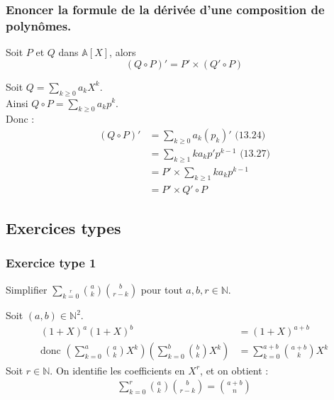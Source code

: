 \documentclass[titlepage, twoside]{report}
\begin{document}
\subsubsection{Enoncer la formule de la dérivée d'une composition de polynômes. }
\begin{tcolorbox}[title=Propostion 13.28, title filled=false, colframe=lightblue, colback=lightblue!10!white]
    Soit $P$ et $Q$ dans $\mathbb{A}[X]$, alors 
    $$(Q \circ P)' = P' \times (Q' \circ P)$$
\end{tcolorbox}

\noindent Soit $Q = \sum\limits_{k \geq 0} a_k X^k$. \\
Ainsi $Q \circ P = \sum\limits_{k \geq 0} a_k p^k$. \\
Donc : 
\begin{align*}
    (Q \circ P)' &= \sum_{k \geq 0} a_k (p_k)' \text{ (13.24)} \\
    &= \sum_{k \geq 1} k a_k p' p^{k-1} \text{ (13.27)} \\
    &= P' \times \sum_{k \geq 1} k a_k p^{k-1} \\
    &= P' \times Q' \circ P
\end{align*}


\subsection{Exercices types}
\subsubsection{Exercice type 1}
\begin{tcolorbox}[title=Exercice 1, title filled=false, colframe=darkgreen, colback=darkgreen!10!white]
    Simplifier $\sum_{k=0}\limits^r\binom{a}{k}\binom{b}{r-k}$ pour tout $a, b, r \in \mathbb{N}$.
\end{tcolorbox}

\noindent Soit $(a, b) \in \mathbb{N}^2$. \\
\begin{align*}
    (1 + X)^a (1 + X)^b &= (1 + X)^{a+b} \\
    \text{donc } \left( \sum_{k=0}^{a} \binom{a}{k} X^k \right) \left( \sum_{k=0}^{b} \binom{b}{k} X^k \right) &= \sum_{k=0}^{a+b} \binom{a+b}{k} X^k
\end{align*}
Soit $r \in \mathbb{N}$. On identifie les coefficients en $X^r$, et on obtient : 
\begin{align*}
    \sum_{k=0}^{r} \binom{a}{k} \binom{b}{r-k} = \binom{a+b}{n}
\end{align*}
\end{document}
